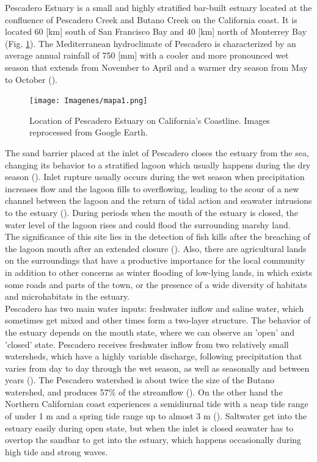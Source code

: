 \documentclass[11pt,letterpaper]{article}
\begin{document}
Pescadero Estuary is a small and highly stratified bar-built estuary located at the confluence of Pescadero Creek and Butano Creek on the California coast. It is located 60 [km] south of San Francisco Bay and 40 [km] north of Monterrey Bay (Fig. \ref{fig:locPDO}). The Mediterranean hydroclimate of Pescadero is characterized by an average annual rainfall of 750 [mm] with a cooler and more pronounced wet season that extends from November to April and a warmer dry season from May to October  (\cite{climatedata2021}).\\

\begin{figure}[h!]
    \centering
    \texttt{[image: Imagenes/mapa1.png]}
    \caption{Location of Pescadero Estuary on California's Coastline. Images reprocessed from Google Earth.}
    \label{fig:locPDO}
\end{figure}

The sand barrier placed at the inlet of Pescadero closes the estuary from the sea, changing its behavior to a stratified lagoon which usually happens during the dry season (\cite{Williams2014}). Inlet rupture usually occurs during the wet season when precipitation increases flow and the lagoon fills to overflowing, leading to the scour of a new channel between the lagoon and the return of tidal action and seawater intrusions to the estuary (\cite{largier2015}). During periods when the mouth of the estuary is closed, the water level of the lagoon rises and could flood the surrounding marshy land. \\

The significance of this site lies in the detection of fish kills after the breaching of the lagoon mouth after an extended closure (\cite{largier2015}). Also, there are agricultural lands on the surroundings that have a productive importance for the local community in addition to other concerns as winter flooding of low-lying lands, in which exists some roads and parts of the town, or the presence of a wide diversity of habitats and microhabitats in the estuary.\\

Pescadero has two main water inputs: freshwater inflow and saline water, which sometimes get mixed and other times form a two-layer structure. The behavior of the estuary depends on the mouth state, where we can observe an 'open' and 'closed' state. Pescadero receives freshwater inflow from two relatively small watersheds, which have a highly variable discharge, following precipitation that varies from day to day through the wet season, as well as seasonally and between years (\cite{largier2015}). The Pescadero watershed is about twice the size of the Butano watershed, and produces 57\% of the streamflow (\cite{Williams2014}). On the other hand the Northern Californian coast experiences a semidiurnal tide with a neap tide range of under 1 m and a spring tide range up to almost 3 m (\cite{Williams2014}). Saltwater get into the estuary easily during open state, but when the inlet is closed seawater has to overtop the sandbar to get into the estuary, which happens occasionally during high tide and strong waves.\\
\end{document}

